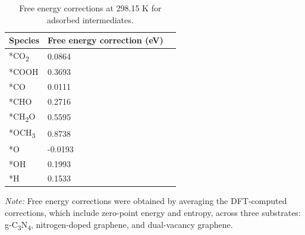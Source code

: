 \documentclass[a4paper, 12pt]{article}
\begin{document}
\begin{table}[htbp]
\label{supp_table3:ads_e_correction}
  \caption{Free energy corrections at 298.15 K for adsorbed intermediates.}
  \centering
  \small
  \begin{tabularx}{0.5\textwidth}{@{}lXr@{}}
    \toprule
    Species                & Free energy correction (eV)  \\
    \midrule
    *CO\textsubscript{2}   &  0.0864                      \\
    *COOH                  &  0.3693                      \\
    *CO                    &  0.0111                      \\
    *CHO                   &  0.2716                      \\
    *CH\textsubscript{2}O  &  0.5595                      \\
    *OCH\textsubscript{3}  &  0.8738                      \\
    *O                     & -0.0193                      \\
    *OH                    &  0.1993                      \\
    *H                     &  0.1533                      \\
    \bottomrule
  \end{tabularx}

  \smallskip

  \begin{flushright}  %
  \begin{minipage}{\textwidth}
    \footnotesize\textit{Note:} {Free energy corrections were obtained by averaging the
      DFT-computed corrections, which include zero-point energy and entropy, across three substrates:
      g-C\textsubscript{3}N\textsubscript{4}, nitrogen-doped graphene, and dual-vacancy graphene.}
  \end{minipage}
  \end{flushright}
\end{table}
\end{document}
